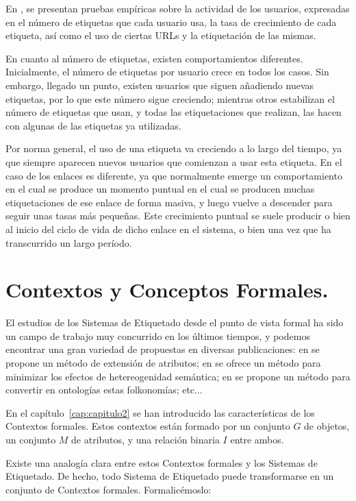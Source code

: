 En \cite{golder}, se presentan pruebas empíricas sobre la actividad de los usuarios, expresadas en el número de etiquetas que cada usuario usa, la tasa de crecimiento de cada etiqueta, así como el uso de ciertas URLs y la etiquetación de las mismas.

En cuanto al número de etiquetas, existen comportamientos diferentes. Inicialmente, el número de etiquetas por usuario crece en todos los casos. Sin embargo, llegado un punto, existen usuarios que siguen añadiendo nuevas etiquetas, por lo que este número sigue creciendo; mientras otros estabilizan el número de etiquetas que usan, y todas las etiquetaciones que realizan, las hacen con algunas de las etiquetas ya utilizadas.

Por norma general, el uso de una etiqueta va creciendo a lo largo del tiempo, ya que siempre aparecen nuevos usuarios que comienzan a usar esta etiqueta. En el caso de los enlaces es diferente, ya que normalmente emerge un comportamiento en el cual se produce un momento puntual en el cual se producen muchas etiquetaciones de ese enlace de forma masiva, y luego vuelve a descender para seguir unas tasas más pequeñas. Este crecimiento puntual se suele producir o bien al inicio del ciclo de vida de dicho enlace en el sistema, o bien una vez que ha transcurrido un largo período.




\section{Contextos y Conceptos Formales.}

El estudios de los Sistemas de Etiquetado desde el punto de vista formal ha sido un campo de trabajo muy concurrido en los últimos tiempos, y podemos encontrar una gran variedad de propuestas en diversas publicaciones: en \cite{alonso} se propone un método de extensión de atributos; en \cite{yeung} se ofrece un método para minimizar los efectos de hetereogenidad semántica; en \cite{van} se propone un método para convertir en ontologías estas folkonomías; etc...

En el capítulo~\ref{cap:capitulo2} se han introducido las características de los Contextos formales. Estos contextos están formado por un conjunto $G$ de objetos, un conjunto $M$ de atributos, y una relación binaria $I$ entre ambos.

Existe una analogía clara entre estos Contextos formales y los Sistemas de Etiquetado. De hecho, todo Sistema de Etiquetado puede transformarse en un conjunto de Contextos formales. Formalicémoslo:

